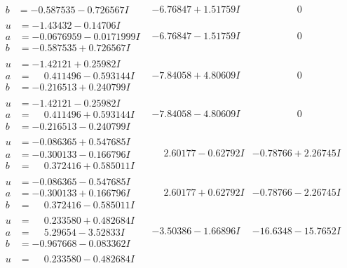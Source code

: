\documentclass[1p]{elsarticle_modified}
\theoremstyle{definition}
\begin{document}
$$\begin{array}{c|c|c}
\begin{aligned}
b &= -0.587535 - 0.726567 I\end{aligned}
 & -6.76847 + 1.51759 I & \phantom{-0.000000 } 0 \\ \hline\begin{aligned}
u &= -1.43432 - 0.14706 I \\
a &= -0.0676959 - 0.0171999 I \\
b &= -0.587535 + 0.726567 I\end{aligned}
 & -6.76847 - 1.51759 I & \phantom{-0.000000 } 0 \\ \hline\begin{aligned}
u &= -1.42121 + 0.25982 I \\
a &= \phantom{-}0.411496 - 0.593144 I \\
b &= -0.216513 + 0.240799 I\end{aligned}
 & -7.84058 + 4.80609 I & \phantom{-0.000000 } 0 \\ \hline\begin{aligned}
u &= -1.42121 - 0.25982 I \\
a &= \phantom{-}0.411496 + 0.593144 I \\
b &= -0.216513 - 0.240799 I\end{aligned}
 & -7.84058 - 4.80609 I & \phantom{-0.000000 } 0 \\ \hline\begin{aligned}
u &= -0.086365 + 0.547685 I \\
a &= -0.300133 - 0.166796 I \\
b &= \phantom{-}0.372416 + 0.585011 I\end{aligned}
 & \phantom{-}2.60177 - 0.62792 I & -0.78766 + 2.26745 I \\ \hline\begin{aligned}
u &= -0.086365 - 0.547685 I \\
a &= -0.300133 + 0.166796 I \\
b &= \phantom{-}0.372416 - 0.585011 I\end{aligned}
 & \phantom{-}2.60177 + 0.62792 I & -0.78766 - 2.26745 I \\ \hline\begin{aligned}
u &= \phantom{-}0.233580 + 0.482684 I \\
a &= \phantom{-}5.29654 - 3.52833 I \\
b &= -0.967668 - 0.083362 I\end{aligned}
 & -3.50386 - 1.66896 I & -16.6348 - 15.7652 I \\ \hline\begin{aligned}
u &= \phantom{-}0.233580 - 0.482684 I \\

\end{aligned}
\end{array}$$
\end{document}
